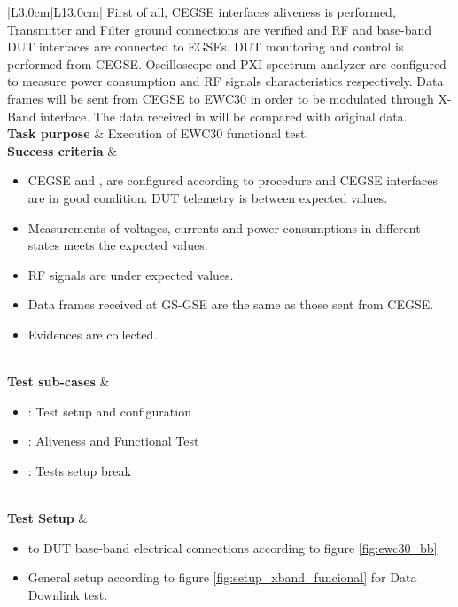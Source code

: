 \begin{table}[H]
\begin{tabular}{|L{3.0cm}|L{13.0cm}|}
		First of all, CEGSE interfaces aliveness is performed,
  Transmitter and Filter ground connections are verified and 
   RF and base-band DUT interfaces are connected to EGSEs.
   DUT monitoring and control is performed from CEGSE{}.
  Oscilloscope and PXI spectrum analyzer are configured 
  to measure power consumption and RF signals characteristics respectively.
Data frames will be sent from CEGSE to  EWC30 in order to be modulated through X-Band interface. 
 The data received in \fmr{} will be compared with 
 original data.\\
		\hline
		\textbf{Task purpose} & Execution of EWC30 functional test. \\
		\hline
		\textbf{Success criteria} & 			\begin{minipage}[t]{\linewidth}
			\begin{itemize}[nosep,after=\strut]
		\item CEGSE and \fmr{}, are configured according to procedure and CEGSE interfaces are in good condition.
DUT telemetry is between expected values.
	\item Measurements of voltages, currents and power consumptions in different states meets the expected values.
	\item RF signals are under expected values.
	\item Data frames received at GS-GSE are the same as those sent from CEGSE.
	\item Evidences are collected. 
				\end{itemize}
		\end{minipage}\\
		\hline
		\textbf{Test sub-cases} & 
\begin{minipage}[t]{\linewidth}
		\begin{itemize}[nosep,after=\strut]
		\item {}: Test setup and configuration
		\item {}: Aliveness and Functional Test
		\item {}: Tests setup break
		\end{itemize}
		\end{minipage}\\
		\hline
		\textbf{Test Setup} &
\begin{minipage}[t]{\linewidth}
	\begin{itemize}[nosep,after=\strut]
		\item \comEgse\xspace to DUT base-band electrical connections according to figure \ref{fig:ewc30_bb} 
		\item General setup according to figure \ref{fig:setup_xband_funcional} for Data Downlink test.

\end{itemize}
\end{minipage}
\end{tabular}
\end{table}
